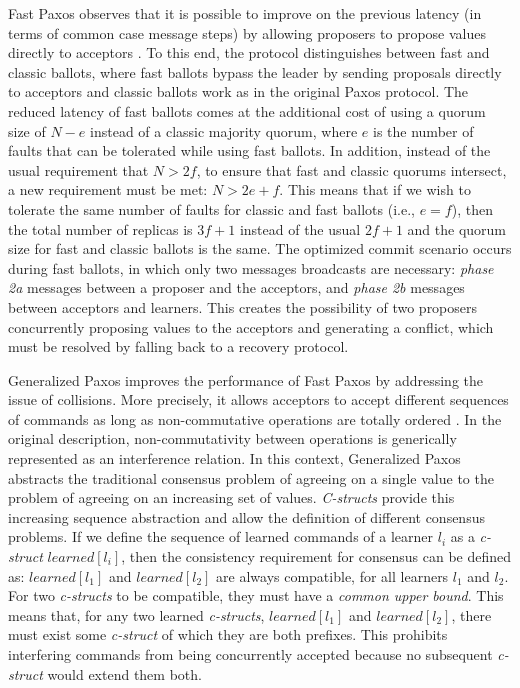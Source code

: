Fast Paxos observes that it is possible to improve on the previous latency (in terms of common case message steps) by allowing proposers to propose values directly to acceptors \cite{L06}. To this end, the protocol distinguishes between fast and classic ballots, where fast ballots bypass the leader by sending proposals directly to acceptors and classic ballots work as in the original Paxos protocol. The reduced latency of fast ballots comes at the additional cost of using a quorum size of $N-e$ instead of a classic majority quorum, where $e$ is the number of faults that can be tolerated while using fast ballots. In addition, instead of the usual requirement that $N> 2f$, to ensure that fast and classic quorums intersect, a new requirement must be met: $N > 2e+f$. This means that if we wish to tolerate the same number of faults for classic and fast ballots (i.e., $e=f$), then the total number of replicas is $3f+1$ instead of the usual $2f+1$ and the quorum size for fast and classic ballots is the same. The optimized commit scenario occurs during fast ballots, in which only two messages broadcasts are necessary: \textit{phase 2a} messages between a proposer and the acceptors, and \textit{phase 2b} messages between acceptors and learners. This creates the possibility of two proposers concurrently proposing values to the acceptors and generating a conflict, which must be resolved by falling back to a recovery protocol. \par
Generalized Paxos improves the performance of Fast Paxos by addressing the issue of collisions. More precisely, it allows acceptors to accept different sequences of commands as long as non-commutative operations are totally ordered \cite{Lamport2005}. In the original description, non-commutativity between operations is generically represented as an interference relation. In this context, Generalized Paxos abstracts the traditional consensus problem of agreeing on a single value to the problem of agreeing on an increasing set of values. \textit{C-structs} provide this increasing sequence abstraction and allow the definition of different consensus problems. If we define the sequence of learned commands of a learner $l_i$ as a \textit{c-struct} $learned[l_i]$, then the consistency requirement for consensus can be defined as: $learned[l_1]$ and $learned[l_2]$ are always compatible, for all learners $l_1$ and $l_2$. For two \textit{c-structs} to be compatible, they must have a \textit{common upper bound}. This means that, for any two learned \textit{c-structs}, $learned[l_1]$ and $learned[l_2]$, there must exist some \textit{c-struct} of which they are both prefixes. This prohibits interfering commands from being concurrently accepted because no subsequent \textit{c-struct} would extend them both. 
